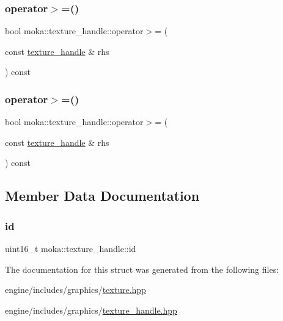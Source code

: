 \mbox{\label{structmoka_1_1texture__handle_a21e800c656613a89c69f96c522bd3e9c}} 
\subsubsection{\texorpdfstring{operator$>$=()}{operator>=()}\hspace{0.1cm}{\footnotesize\ttfamily [1/2]}}
{\footnotesize\ttfamily bool moka\+::texture\+\_\+handle\+::operator$>$= (\begin{DoxyParamCaption}\item[{const \mbox{\hyperlink{structmoka_1_1texture__handle}{texture\+\_\+handle}} \&}]{rhs }\end{DoxyParamCaption}) const}

\mbox{\label{structmoka_1_1texture__handle_a21e800c656613a89c69f96c522bd3e9c}} 
\subsubsection{\texorpdfstring{operator$>$=()}{operator>=()}\hspace{0.1cm}{\footnotesize\ttfamily [2/2]}}
{\footnotesize\ttfamily bool moka\+::texture\+\_\+handle\+::operator$>$= (\begin{DoxyParamCaption}\item[{const \mbox{\hyperlink{structmoka_1_1texture__handle}{texture\+\_\+handle}} \&}]{rhs }\end{DoxyParamCaption}) const}



\subsection{Member Data Documentation}
\mbox{\label{structmoka_1_1texture__handle_a2f5aa97e077908c84ecbd822024011c7}} 
\subsubsection{\texorpdfstring{id}{id}}
{\footnotesize\ttfamily uint16\+\_\+t moka\+::texture\+\_\+handle\+::id}



The documentation for this struct was generated from the following files\+:\begin{DoxyCompactItemize}
\item 
engine/includes/graphics/\mbox{\hyperlink{texture_8hpp}{texture.\+hpp}}\item 
engine/includes/graphics/\mbox{\hyperlink{texture__handle_8hpp}{texture\+\_\+handle.\+hpp}}\end{DoxyCompactItemize}
